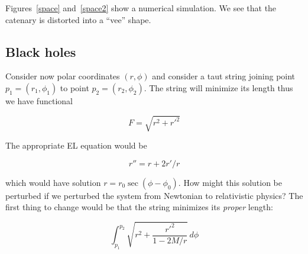 \documentclass[pdflatex,sn-mathphys-num]{sn-jnl}%
\theoremstyle{thmstyleone}%
\theoremstyle{thmstyletwo}%
\theoremstyle{thmstylethree}%
\begin{document}
Figures~\ref{space} and~\ref{space2} show a numerical simulation.  We
see that the catenary is distorted into a ``vee'' shape.


\subsection{Black holes}

Consider now polar coordinates $(r,\phi)$ and consider a taut string
joining point $p_1=(r_1,\phi_1)$ to point $p_2=(r_2,\phi_2)$.  The
string will minimize its length thus we have  functional

\begin{equation}
  F=\sqrt{r^2 + r'^2}
\end{equation}

The appropriate EL equation would be

\begin{equation}
r'' = r + 2r'/r
\end{equation}

which would have solution $r=r_0\sec(\phi-\phi_0)$.  How might this
solution be perturbed if we perturbed the system from Newtonian to
relativistic physics?  The first thing to change would be that the
string minimizes its {\em proper} length:

\begin{equation}
  \int_{p_1}^{p_2}\sqrt{r^2 + \frac{r'^2}{1-2M/r}}\,d\phi
\end{equation}


  
  



\end{document}
